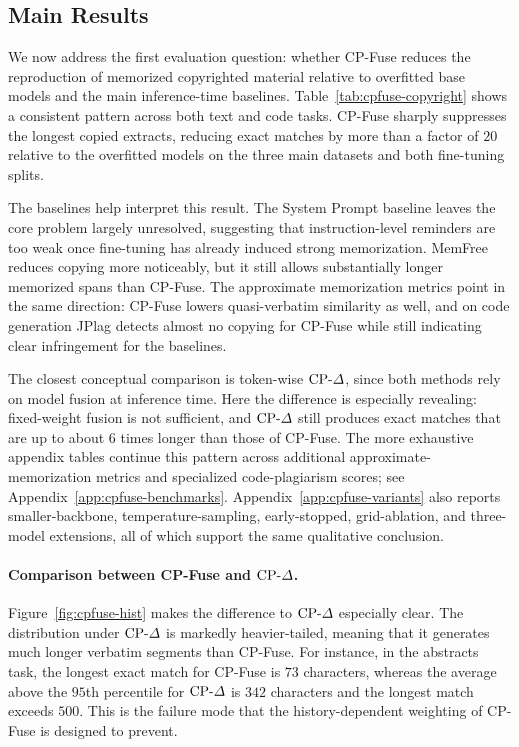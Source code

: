 \subsection{Main Results}
\label{sec:cpfuse-main-results}

We now address the first evaluation question: whether CP-Fuse reduces the reproduction of memorized copyrighted material relative to overfitted base models and the main inference-time baselines. Table~\ref{tab:cpfuse-copyright} shows a consistent pattern across both text and code tasks. CP-Fuse sharply suppresses the longest copied extracts, reducing exact matches by more than a factor of \(20\) relative to the overfitted models on the three main datasets and both fine-tuning splits.

The baselines help interpret this result. The System Prompt baseline leaves the core problem largely unresolved, suggesting that instruction-level reminders are too weak once fine-tuning has already induced strong memorization. MemFree reduces copying more noticeably, but it still allows substantially longer memorized spans than CP-Fuse. The approximate memorization metrics point in the same direction: CP-Fuse lowers quasi-verbatim similarity as well, and on code generation JPlag detects almost no copying for CP-Fuse while still indicating clear infringement for the baselines.

The closest conceptual comparison is token-wise \(\text{CP-}\Delta\), since both methods rely on model fusion at inference time. Here the difference is especially revealing: fixed-weight fusion is not sufficient, and \(\text{CP-}\Delta\) still produces exact matches that are up to about \(6\) times longer than those of CP-Fuse. The more exhaustive appendix tables continue this pattern across additional approximate-memorization metrics and specialized code-plagiarism scores; see Appendix~\ref{app:cpfuse-benchmarks}. Appendix~\ref{app:cpfuse-variants} also reports smaller-backbone, temperature-sampling, early-stopped, grid-ablation, and three-model extensions, all of which support the same qualitative conclusion.


\paragraph{Comparison between CP-Fuse and \(\text{CP-}\Delta\).}
Figure~\ref{fig:cpfuse-hist} makes the difference to \(\text{CP-}\Delta\) especially clear. The distribution under \(\text{CP-}\Delta\) is markedly heavier-tailed, meaning that it generates much longer verbatim segments than CP-Fuse. For instance, in the abstracts task, the longest exact match for CP-Fuse is \(73\) characters, whereas the average above the \(95\)th percentile for \(\text{CP-}\Delta\) is \(342\) characters and the longest match exceeds \(500\). This is the failure mode that the history-dependent weighting of CP-Fuse is designed to prevent.

